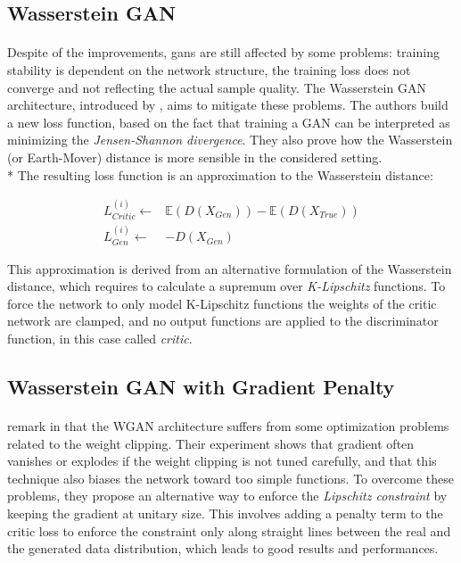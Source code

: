 \subsection{Wasserstein GAN}
\paragraph{} Despite of the improvements, \glspl{gan} are still affected by some problems: training stability is dependent on the network structure, the training loss does not converge and not reflecting the actual sample quality. The Wasserstein GAN architecture, introduced by \citeauthor{wgan} \cite{wgan}, aims to mitigate these problems. The authors build a new loss function, based on the fact that training a GAN can be interpreted as minimizing the \textit{Jensen-Shannon divergence}\cite{jsdivergence}. They also prove how the Wasserstein (or Earth-Mover) \cite[\S~3]{wgan} distance is more sensible in the considered setting. \\* The resulting loss function is an approximation to the Wasserstein distance:

\begin{equation}
\label{eq:wganloss}
\begin{split}
L_{Critic}^{(i)} \gets & \mathbb{E}(D(X_{Gen})) - \mathbb{E}(D(X_{True}))\\
L_{Gen}^{(i)} \gets & -D(X_{Gen}) 
\end{split}
\end{equation}

This approximation is derived from an alternative formulation of the Wasserstein distance, which requires to calculate a supremum over \textit{K-Lipschitz} functions. To force the network to only model K-Lipschitz functions the weights of the critic network are clamped, and no output functions are applied to the discriminator function, in this case called \textit{critic}.  

\subsection{Wasserstein GAN with Gradient Penalty}
\paragraph{} \citeauthor{wgangp} remark in \cite{wgangp} that the WGAN architecture suffers from some optimization problems related to the weight clipping. Their experiment shows that gradient often vanishes or explodes if the weight clipping is not tuned carefully, and that this technique also biases the network toward too simple functions. To overcome these problems, they propose an alternative way to enforce the \textit{Lipschitz constraint} by keeping the gradient at unitary size. This involves adding a penalty term to the critic loss to enforce the constraint only along straight lines between the real and the generated data distribution, which leads to good results and performances.

